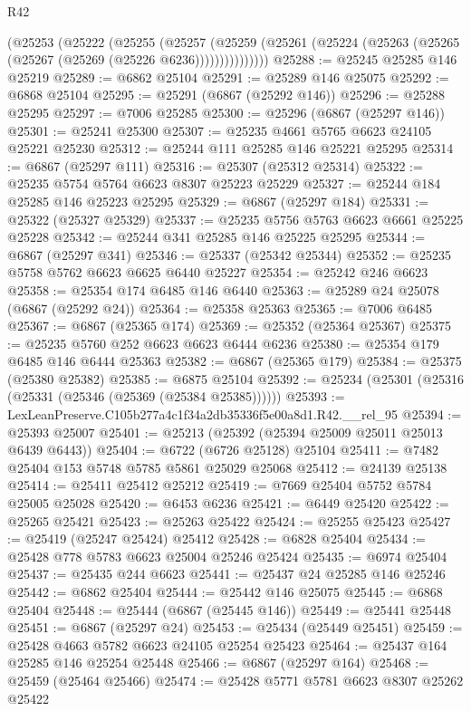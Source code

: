 \begin{lexlean}{R42}
\begin{coremodule}
{          (@25253
            (@25222
              (@25255
                (@25257
                  (@25259
                    (@25261 (@25224 (@25263 (@25265 (@25267 (@25269 (@25226 @6236)))))))))))))))
@25288 := @25245 @25285 @146 @25219
@25289 := @6862 @25104
@25291 := @25289 @146 @25075
@25292 := @6868 @25104
@25295 := @25291 (@6867 (@25292 @146))
@25296 := @25288 @25295
@25297 := @7006 @25285
@25300 := @25296 (@6867 (@25297 @146))
@25301 := @25241 @25300
@25307 := @25235 @4661 @5765 @6623 @24105 @25221 @25230
@25312 := @25244 @111 @25285 @146 @25221 @25295
@25314 := @6867 (@25297 @111)
@25316 := @25307 (@25312 @25314)
@25322 := @25235 @5754 @5764 @6623 @8307 @25223 @25229
@25327 := @25244 @184 @25285 @146 @25223 @25295
@25329 := @6867 (@25297 @184)
@25331 := @25322 (@25327 @25329)
@25337 := @25235 @5756 @5763 @6623 @6661 @25225 @25228
@25342 := @25244 @341 @25285 @146 @25225 @25295
@25344 := @6867 (@25297 @341)
@25346 := @25337 (@25342 @25344)
@25352 := @25235 @5758 @5762 @6623 @6625 @6440 @25227
@25354 := @25242 @246 @6623
@25358 := @25354 @174 @6485 @146 @6440
@25363 := @25289 @24 @25078 (@6867 (@25292 @24))
@25364 := @25358 @25363
@25365 := @7006 @6485
@25367 := @6867 (@25365 @174)
@25369 := @25352 (@25364 @25367)
@25375 := @25235 @5760 @252 @6623 @6623 @6444 @6236
@25380 := @25354 @179 @6485 @146 @6444 @25363
@25382 := @6867 (@25365 @179)
@25384 := @25375 (@25380 @25382)
@25385 := @6875 @25104
@25392 := @25234 (@25301 (@25316 (@25331 (@25346 (@25369 (@25384 @25385))))))
@25393 := LexLeanPreserve.C105b277a4c1f34a2db35336f5e00a8d1.R42.__rel_95
@25394 := @25393 @25007
@25401 := @25213 (@25392 (@25394 @25009 @25011 @25013 @6439 @6443))
@25404 := @6722 (@6726 @25128) @25104
@25411 := @7482 @25404 @153 @5748 @5785 @5861 @25029 @25068
@25412 := @24139 @25138
@25414 := @25411 @25412 @25212
@25419 := @7669 @25404 @5752 @5784 @25005 @25028
@25420 := @6453 @6236
@25421 := @6449 @25420
@25422 := @25265 @25421
@25423 := @25263 @25422
@25424 := @25255 @25423
@25427 := @25419 (@25247 @25424) @25412
@25428 := @6828 @25404
@25434 := @25428 @778 @5783 @6623 @25004 @25246 @25424
@25435 := @6974 @25404
@25437 := @25435 @244 @6623
@25441 := @25437 @24 @25285 @146 @25246
@25442 := @6862 @25404
@25444 := @25442 @146 @25075
@25445 := @6868 @25404
@25448 := @25444 (@6867 (@25445 @146))
@25449 := @25441 @25448
@25451 := @6867 (@25297 @24)
@25453 := @25434 (@25449 @25451)
@25459 := @25428 @4663 @5782 @6623 @24105 @25254 @25423
@25464 := @25437 @164 @25285 @146 @25254 @25448
@25466 := @6867 (@25297 @164)
@25468 := @25459 (@25464 @25466)
@25474 := @25428 @5771 @5781 @6623 @8307 @25262 @25422
}
\end{coremodule}
\end{lexlean}

